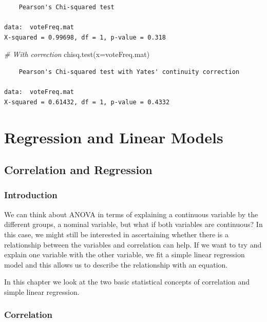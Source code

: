 \documentclass[
  oneside]{krantz}
\newenvironment{Shaded}{\begin{snugshade}}{\end{snugshade}}
\newcommand{\AttributeTok}[1]{\textcolor[rgb]{0.77,0.63,0.00}{#1}}
\newcommand{\CommentTok}[1]{\textcolor[rgb]{0.56,0.35,0.01}{\textit{#1}}}
\newcommand{\FunctionTok}[1]{\textcolor[rgb]{0.00,0.00,0.00}{#1}}
\newcommand{\NormalTok}[1]{#1}
\begin{document}
\begin{verbatim}
    Pearson's Chi-squared test

data:  voteFreq.mat
X-squared = 0.99698, df = 1, p-value = 0.318
\end{verbatim}

\begin{Shaded}
\begin{Highlighting}[]
\CommentTok{\# With correction}
\FunctionTok{chisq.test}\NormalTok{(}\AttributeTok{x=}\NormalTok{voteFreq.mat)}
\end{Highlighting}
\end{Shaded}

\begin{verbatim}
    Pearson's Chi-squared test with Yates' continuity correction

data:  voteFreq.mat
X-squared = 0.61432, df = 1, p-value = 0.4332
\end{verbatim}

\hypertarget{part-regression-and-linear-models}{%
\part{Regression and Linear Models}\label{part-regression-and-linear-models}}

\hypertarget{correg}{%
\chapter{Correlation and Regression}\label{correg}}

\hypertarget{introcorreg}{%
\section{Introduction}\label{introcorreg}}

We can think about ANOVA in terms of explaining a continuous variable by the different groups, a nominal variable, but what if both variables are continuous? In this case, we might still be interested in ascertaining whether there is a relationship between the variables and correlation can help. If we want to try and explain one variable with the other variable, we fit a simple linear regression model and this allows us to describe the relationship with an equation.

In this chapter we look at the two basic statistical concepts of correlation and simple linear regression.

\hypertarget{correlation}{%
\section{Correlation}\label{correlation}}
\end{document}
